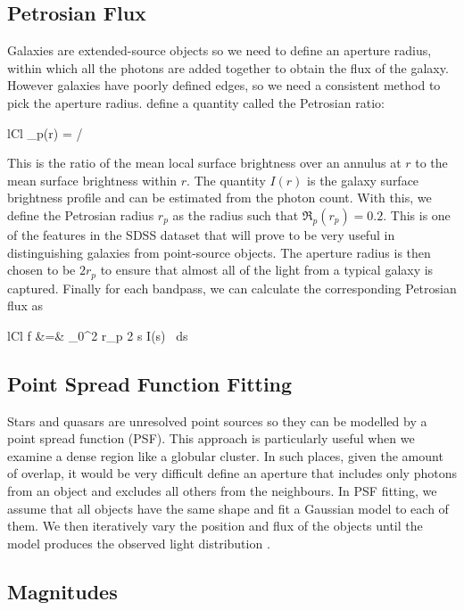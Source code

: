 \subsection{Petrosian Flux}

Galaxies are extended-source objects so we need to define an aperture radius, within which
all the photons are added together to obtain the flux of the galaxy. However galaxies have
poorly defined edges, so we need a consistent method to pick the aperture radius.  define a quantity called the Petrosian ratio:
	\begin{IEEEeqnarray*}{lCl}
		_p(r) = 
							\bigg/ 
	\end{IEEEeqnarray*}
This is the ratio of the mean local surface brightness over an annulus at $r$ to the mean
surface brightness within $r$. The quantity $I(r)$ is the galaxy surface brightness profile
and can be estimated from the photon count. With this, we define the Petrosian
radius $r_p$ as the radius such that $\mathfrak{R}_p(r_p) = 0.2$. This is one of the features
in the SDSS dataset that will prove to be very useful in distinguishing galaxies from
point-source objects. The aperture radius is then chosen to be $2r_p$ to ensure that almost
all of the light from a typical galaxy is captured. Finally for each bandpass, we can calculate
the corresponding Petrosian flux as
	\begin{IEEEeqnarray*}{lCl}
		f &=& \int_{0}^{2 r_p} 2 \pi s I(s) \, ds
	\end{IEEEeqnarray*}

\subsection{Point Spread Function Fitting}
Stars and quasars are unresolved point sources so they can be modelled by a point
spread function (PSF). This approach is particularly useful when we examine a dense region
like a globular cluster. In such places, given the amount of overlap, it would be very
difficult define an aperture that includes only photons from an object and excludes all others
from the neighbours. In PSF fitting, we assume that all objects have the same shape and fit
a Gaussian model to each of them. We then iteratively vary the position and flux of the objects
until the model produces the observed light distribution \cite{palmer01}.


\subsection{Magnitudes}

